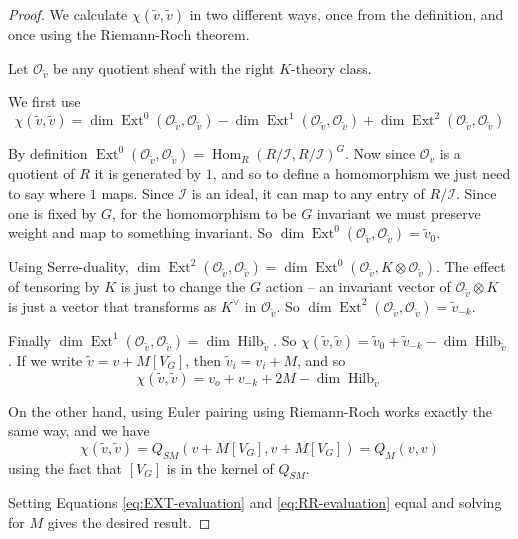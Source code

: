 \documentclass{amsart}[12pt]
\theoremstyle{definition}
\newcommand{\OO}{\mathcal{O}}
\newcommand{\II}{\mathcal{I}}
\DeclareMathOperator{\Hilb}{Hilb}
\DeclareMathOperator{\Ext}{Ext}
\DeclareMathOperator{\Hom}{Hom}
\begin{document}
\begin{proof}
We calculate $\chi(\tilde{v},\tilde{v})$ in two different ways, once from the definition, and once using the Riemann-Roch theorem.

Let $\OO_{\tilde{v}}$ be any quotient sheaf with the right $K$-theory class.  

We first use
$$\chi(\tilde{v}, \tilde{v})=\dim\Ext^0(\OO_{\tilde{v}},\OO_{\tilde{v}})-\dim\Ext^1(\OO_{\tilde{v}},\OO_{\tilde{v}})+\dim\Ext^2(\OO_{\tilde{v}},\OO_{\tilde{v}})$$

By definition $\Ext^0(\OO_{\tilde{v}},\OO_{\tilde{v}})=\Hom_R(R/\II,R/\II)^G$.  Now since $\OO_v$ is a quotient of $R$ it is generated by $1$, and so to define a homomorphism we just need to say where $1$ maps. Since $\II$ is an ideal, it can map to any entry of $R/\II$.  Since one is fixed by $G$, for the homomorphism to be $G$ invariant we must preserve weight and map to something invariant.  So $\dim\Ext^0(\OO_{\tilde{v}},\OO_{\tilde{v}})=\tilde{v}_0$.  

Using Serre-duality, $\dim\Ext^2(\OO_{\tilde{v}},\OO_{\tilde{v}})=\dim\Ext^0(\OO_{\tilde{v}},K\otimes\OO_{\tilde{v}})$.  The effect of tensoring by $K$ is just to change the $G$ action -- an invariant vector of $\OO_{\tilde{v}}\otimes K$ is just a vector that transforms as $K^\vee$ in $\OO_{\tilde{v}}$.  
So $\dim\Ext^2(\OO_{\tilde{v}},\OO_{\tilde{v}})=\tilde{v}_{-k}$.  

Finally $\dim\Ext^1(\OO_{\tilde{v}},\OO_{\tilde{v}})=\dim\Hilb_{\tilde{v}}$.  So $\chi(\tilde{v},\tilde{v})=\tilde{v}_0+\tilde{v}_{-k}-\dim\Hilb_{\tilde{v}}$.  If we write $\tilde{v}=v+M [V_G]$, then $\tilde{v}_i=v_i+M$, and so  
\begin{equation} \label{eq:EXT-evaluation}
\chi(\tilde{v},\tilde{v})=v_o+v_{-k}+2M-\dim\Hilb_{\tilde{v}} 
\end{equation}

On the other hand, using Euler pairing using Riemann-Roch works exactly the same way, and we have
\begin{equation} \label{eq:RR-evaluation}
\chi(\tilde{v},\tilde{v})=Q_{SM}(v+M[V_G],v+M[V_G])=Q_M(v,v)
\end{equation}
using the fact that $[V_G]$ is in the kernel of $Q_{SM}$.  

Setting Equations \ref{eq:EXT-evaluation} and \ref{eq:RR-evaluation} equal and solving for $M$ gives the desired result.

\end{proof}
\end{document}
